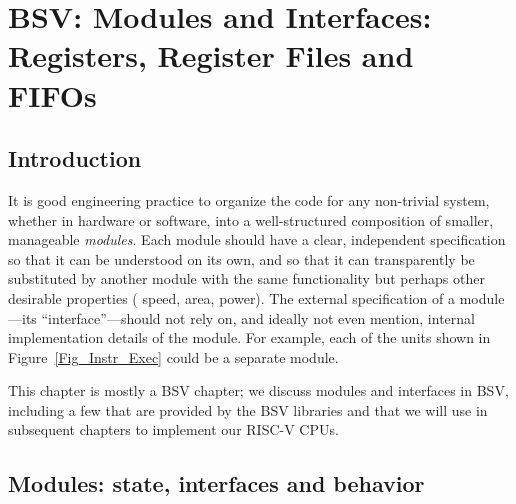 

\chapter{BSV: Modules and Interfaces: Registers, Register Files and FIFOs}


\setcounter{page}{1}
\renewcommand{\thepage}{\arabic{chapter}-\arabic{page}}

\label{ch_Modules_and_Interfaces}


\section{Introduction}

It is good engineering practice to organize the code for any
non-trivial system, whether in hardware or software, into a
well-structured composition of smaller, manageable \emph{modules}.
Each module should have a clear, independent specification so that it
can be understood on its own, and so that it can transparently be
substituted by another module with the same functionality but perhaps
other desirable properties ({\eg} speed, area, power).  The external
specification of a module---its ``interface''---should not rely on,
and ideally not even mention, internal implementation details of the
module.  For example, each of the units shown in
Figure~\ref{Fig_Instr_Exec} could be a separate module.

This chapter is mostly a BSV chapter; we discuss modules and
interfaces in BSV, including a few that are provided by the BSV
libraries and that we will use in subsequent chapters to implement our
RISC-V CPUs.


\section{Modules: state, interfaces and behavior}

\label{Sec_Modules}


